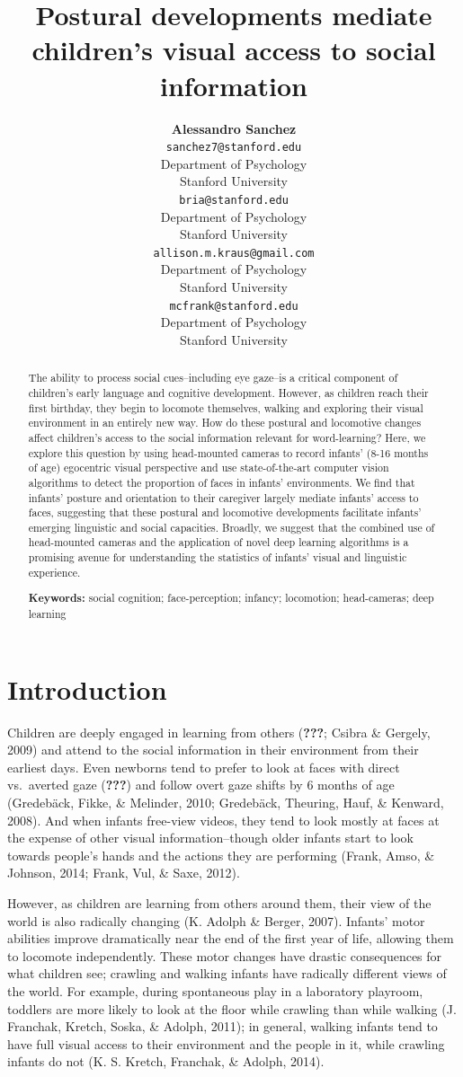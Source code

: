 \documentclass[10pt, letterpaper]{article}
\title{Postural developments mediate children's visual access to social
information}
\author{{\large \bf Alessandro Sanchez} \\ \texttt{sanchez7@stanford.edu} \\ Department of Psychology \\ Stanford University \And {\large \bf Bria Long} \\ \texttt{bria@stanford.edu} \\ Department of Psychology \\ Stanford University \And {\large \bf Ally Kraus} \\ \texttt{allison.m.kraus@gmail.com} \\ Department of Psychology \\ Stanford University \And {\large \bf Michael C. Frank} \\ \texttt{mcfrank@stanford.edu} \\ Department of Psychology \\ Stanford University}
\begin{document}
\maketitle

\begin{abstract}
The ability to process social cues--including eye gaze--is a critical
component of children's early language and cognitive development.
However, as children reach their first birthday, they begin to locomote
themselves, walking and exploring their visual environment in an
entirely new way. How do these postural and locomotive changes affect
children's access to the social information relevant for word-learning?
Here, we explore this question by using head-mounted cameras to record
infants' (8-16 months of age) egocentric visual perspective and use
state-of-the-art computer vision algorithms to detect the proportion of
faces in infants' environments. We find that infants' posture and
orientation to their caregiver largely mediate infants' access to faces,
suggesting that these postural and locomotive developments facilitate
infants' emerging linguistic and social capacities. Broadly, we suggest
that the combined use of head-mounted cameras and the application of
novel deep learning algorithms is a promising avenue for understanding
the statistics of infants' visual and linguistic experience.

\textbf{Keywords:}
social cognition; face-perception; infancy; locomotion; head-cameras;
deep learning
\end{abstract}

\section{Introduction}\label{introduction}

Children are deeply engaged in learning from others ({\textbf{???}};
Csibra \& Gergely, 2009) and attend to the social information in their
environment from their earliest days. Even newborns tend to prefer to
look at faces with direct vs.~averted gaze ({\textbf{???}}) and follow
overt gaze shifts by 6 months of age (Gredebäck, Fikke, \& Melinder,
2010; Gredebäck, Theuring, Hauf, \& Kenward, 2008). And when infants
free-view videos, they tend to look mostly at faces at the expense of
other visual information--though older infants start to look towards
people's hands and the actions they are performing (Frank, Amso, \&
Johnson, 2014; Frank, Vul, \& Saxe, 2012).

However, as children are learning from others around them, their view of
the world is also radically changing (K. Adolph \& Berger, 2007).
Infants' motor abilities improve dramatically near the end of the first
year of life, allowing them to locomote independently. These motor
changes have drastic consequences for what children see; crawling and
walking infants have radically different views of the world. For
example, during spontaneous play in a laboratory playroom, toddlers are
more likely to look at the floor while crawling than while walking (J.
Franchak, Kretch, Soska, \& Adolph, 2011); in general, walking infants
tend to have full visual access to their environment and the people in
it, while crawling infants do not (K. S. Kretch, Franchak, \& Adolph,
2014).
\end{document}
